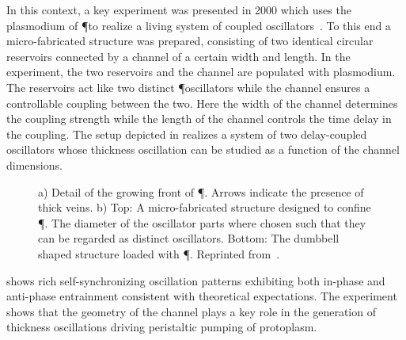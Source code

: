 			In this context, a key experiment was presented in 2000 which uses the plasmodium of \P to realize a living system of coupled oscillators~\cite{PhysRevLett.85.2026}. To this end a micro-fabricated structure was prepared, consisting of two identical circular reservoirs connected by a channel of a certain width and length. In the experiment, the two reservoirs and the channel are populated with plasmodium. The reservoirs act like two distinct \P oscillators while the channel ensures a controllable coupling between the two. Here the width of the channel determines the coupling strength while the length of the channel controls the time delay in the coupling. The setup depicted in  realizes a system of two delay-coupled oscillators whose thickness oscillation can be studied as a function of the channel dimensions.

			\begin{figure}
				\centering
	
				\caption[Oscillator experiment - Setup]{a) Detail of the growing front of \P. Arrows indicate the presence of thick veins. b) Top: A micro-fabricated structure designed to confine \P. The diameter of the oscillator parts where chosen such that they can be regarded as distinct oscillators. Bottom: The dumbbell shaped structure loaded with \P. Reprinted from~\cite{PhysRevLett.85.2026}.}
				\label{fig:oscillator_experiment_setup}
			\end{figure}

			 shows rich self-synchronizing oscillation patterns exhibiting both in-phase and anti-phase entrainment consistent with theoretical expectations. The experiment shows that the geometry of the channel plays a key role in the generation of thickness oscillations driving peristaltic pumping of protoplasm.

